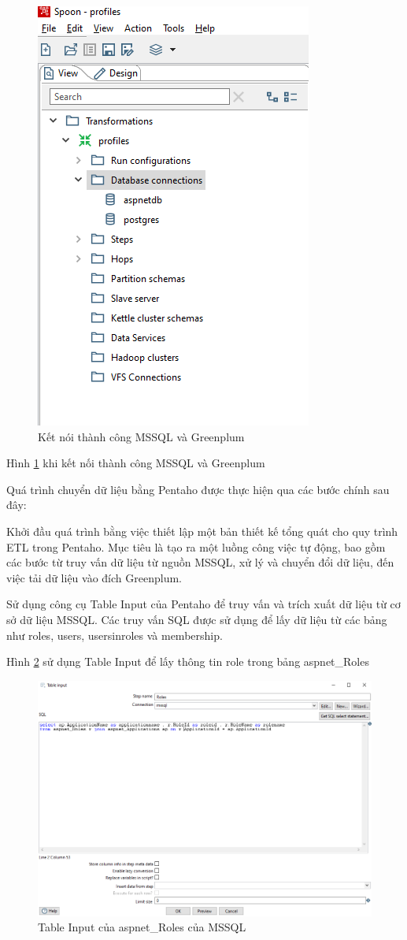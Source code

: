 \documentclass{article}[14pt]
\begin{document}
\begin{figure}
    \centering
    \includegraphics[width=0.5\linewidth]{images/ComMSGL.png}
    \caption{Kết nói thành công MSSQL và Greenplum}
    \label{fig:ComMSGL}
\end{figure}



Hình \ref{fig:ComMSGL} khi kết nối thành công MSSQL và Greenplum 


Quá trình chuyển dữ liệu bằng Pentaho được thực hiện qua các bước chính sau đây:

Khởi đầu quá trình bằng việc thiết lập một bản thiết kế tổng quát cho quy trình ETL trong Pentaho. Mục tiêu là tạo ra một luồng công việc tự động, bao gồm các bước từ truy vấn dữ liệu từ nguồn MSSQL, xử lý và chuyển đổi dữ liệu, đến việc tải dữ liệu vào đích Greenplum.

Sử dụng công cụ Table Input của Pentaho để truy vấn và trích xuất dữ liệu từ cơ sở dữ liệu MSSQL. Các truy vấn SQL được sử dụng để lấy dữ liệu từ các bảng như roles, users, usersinroles và membership.

Hình \ref{fig:roles} sử dụng Table Input để lấy thông tin role trong bảng aspnet\_Roles

\begin{figure}
    \centering
    \includegraphics[width=0.8\linewidth]{images/roles.png}
    \caption{Table Input của aspnet\_Roles của MSSQL}
    \label{fig:roles}
\end{figure}
\end{document}
